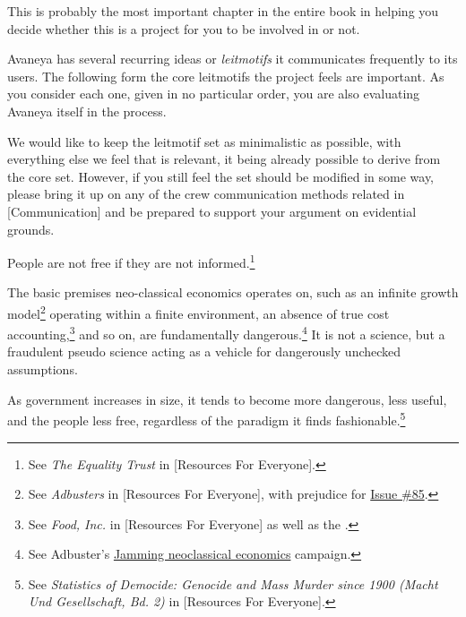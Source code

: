

This is probably the most important chapter in the entire book in helping you decide whether this is a project for you to be involved in or not. 

Avaneya has several recurring ideas or {\it leitmotifs} it communicates frequently to its users. The following form the core leitmotifs the project feels are important. As you consider each one, given in no particular order, you are also evaluating Avaneya itself in the process.

We would like to keep the leitmotif set as minimalistic as possible, with everything else we feel that is relevant, it being already possible to derive from the core set. However, if you still feel the set should be modified in some way, please bring it up on any of the crew communication methods related in [Communication] and be prepared to support your argument on evidential grounds.

\startitemize[R]
\setupwhitespace[big]
\item
People are not free if they are not informed.\footnote{See {\it The Equality Trust} in [Resources For Everyone].}

\item
The basic premises neo-classical economics operates on, such as an infinite growth model\footnote{See {\it Adbusters} in [Resources For Everyone], with prejudice for \href{http://www.adbusters.org/cultureshop/backissues/85}{Issue \#85}.} operating within a finite environment, an absence of true cost accounting,\footnote{See {\it Food, Inc.} in [Resources For Everyone] as well as the .} and so on, are fundamentally dangerous.\footnote{See Adbuster's \href{http://anticap.wordpress.com/2010/10/25/jamming-neoclassical-economics/}{Jamming neoclassical economics} campaign.} It is not a science, but a fraudulent pseudo science acting as a vehicle for dangerously unchecked assumptions.

\item
As government increases in size, it tends to become more dangerous, less useful, and the people less free, regardless of the paradigm it finds fashionable.\footnote{See {\it Statistics of Democide: Genocide and Mass Murder since 1900 (Macht Und Gesellschaft, Bd. 2)} in [Resources For Everyone].}

